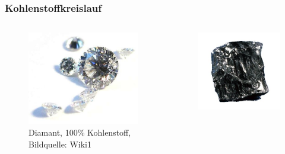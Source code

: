 \begin{frame}
	\frametitle{Kohlenstoffkreislauf}
	\begin{columns}
		\begin{figure}
			\centering
			\includegraphics[width=\linewidth]{bilder/kohlenstoff/Brillanten}
			\caption{Diamant, 100\% Kohlenstoff, Bildquelle: Wiki1}
		\end{figure}
		\begin{figure}
			\centering
			\includegraphics[width=\linewidth]{bilder/kohlenstoff/kohle}

\end{figure}
\end{columns}
\end{frame}

